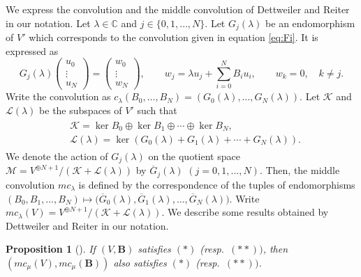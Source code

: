 \documentclass[pdftex]{sigma}
\numberwithin{equation}{section}
\newtheorem{Proposition}[Theorem]{Proposition}
\theoremstyle{definition}
\begin{document}
We express the convolution and the middle convolution of Dettweiler and Reiter in our notation.
Let $\lambda \in \mathbb{C} $ and $j \in \{ 0,1, \dots ,N \}$.
Let $G_j (\lambda )$ be an endomorphism of $V'$ which corresponds to the convolution given in equation \eqref{eq:Fi}.
It is expressed as
\begin{equation}
G_j (\lambda ) \begin{pmatrix} u_{0} \\ \vdots \\ u_{N} \end{pmatrix} =\begin{pmatrix} w_{0} \\ \vdots \\ w_{N} \end{pmatrix}, \qquad w_j = \lambda u_j + \sum _{i=0}^{N} B_i u_i , \qquad w _k =0,\quad k\neq j.
\label{eq:GjDR}
\end{equation}
Write the convolution as $c_\lambda (B_0, \dots , B_N ) = ( G_0 (\lambda ), \dots , G_N (\lambda )) $.
Let $ \mathcal{K} $ and $\mathcal{L} ( \lambda ) $ be the subspaces of $V'$ such that
\begin{align*}
\begin{split}
& \mathcal{K} = \operatorname{ker}B_0 \oplus \operatorname{ker}B_1 \oplus \cdots \oplus \operatorname{ker}B_N, \\
& \mathcal{L} ( \lambda ) = \operatorname{ker}(G_0 (\lambda ) +G_1 (\lambda ) + \cdots + G_N (\lambda ) ).
\end{split}
\end{align*}
We denote the action of $G_j (\lambda ) $ on the quotient space $ {\mathcal M } = V^{\oplus N+1}/( \mathcal{K} + \mathcal{L} ( \lambda ) )$ by $\overline{G}_j (\lambda )$ $(j=0 ,1, \dots ,N )$.
Then, the middle convolution $mc_\lambda $ is defined by the correspondence of the tuples of endomorphisms $ (B_{0}, B_{1} ,\dots ,B_N ) \mapsto \bigl( \overline{G}_0 (\lambda ) , \overline{G}_1 (\lambda ) ,\dots ,\overline{G}_N (\lambda )\bigr) $.
Write $mc_\lambda (V) = V^{\oplus N+1}/( \mathcal{K} + \mathcal{L} ( \lambda ) ) $.
We describe some results obtained by Dettweiler and Reiter \cite{DR1} in our notation.
\begin{Proposition}[{\cite[Proposition 3.4]{DR1}}] \label{prop:*,**}
If $(V ,\boldsymbol{B}) $ satisfies $(*)$ {\rm(}resp.~$(**))$, then $(mc _{\mu }(V),\allowbreak mc _{\mu } (\boldsymbol{B} ))$ also satisfies $(*)$ {\rm(}resp.~$(**))$.
\end{Proposition}
\end{document}
